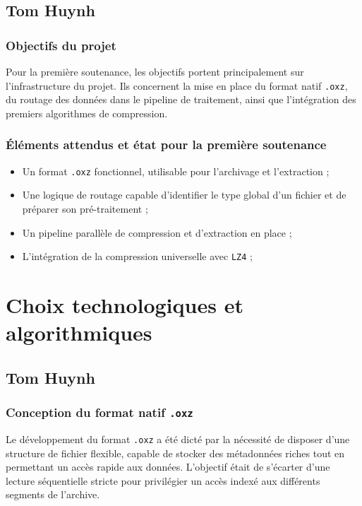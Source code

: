 \documentclass{article}
\begin{document}
\subsection{Tom Huynh}

\subsubsection{Objectifs du projet}

Pour la première soutenance, les objectifs portent principalement sur l'infrastructure du projet. Ils concernent la mise en place du format natif \texttt{.oxz}, du routage des données dans le pipeline de traitement, ainsi que l'intégration des premiers algorithmes de compression.

\subsubsection*{Éléments attendus et état pour la première soutenance}


\begin{itemize}
    \item Un format \texttt{.oxz} fonctionnel, utilisable pour l'archivage et l'extraction ;
    \item Une logique de routage capable d'identifier le type global d'un fichier et de préparer son pré-traitement ;
    \item Un pipeline parallèle de compression et d'extraction en place ;
    \item L'intégration de la compression universelle avec \texttt{LZ4} ;
\end{itemize}

\newpage
\section{Choix technologiques et algorithmiques}

\subsection{Tom Huynh}

\subsubsection{Conception du format natif \texttt{.oxz}}

Le développement du format \texttt{.oxz} a été dicté par la nécessité de disposer d'une structure de fichier flexible, capable de stocker des métadonnées riches tout en permettant un accès rapide aux données. L'objectif était de s'écarter d'une lecture séquentielle stricte pour privilégier un accès indexé aux différents segments de l'archive.
\end{document}
